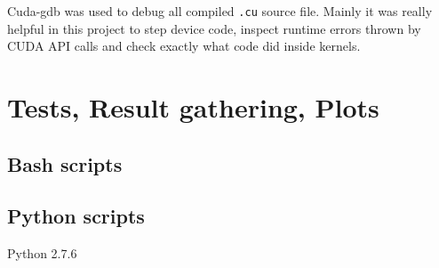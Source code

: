 		Cuda-gdb was used to debug all compiled \texttt{.cu} source file.
		Mainly it was really helpful in this project to step device code, inspect runtime errors thrown by CUDA API calls and check exactly what code did inside kernels.
	
	
	
\section{Tests, Result gathering, Plots}
\subsection{Bash scripts}
\subsection{Python scripts}
Python 2.7.6

